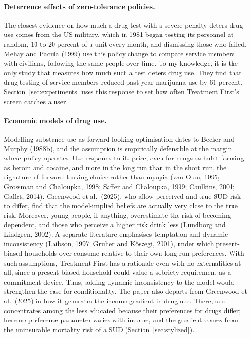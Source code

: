 \documentclass[10pt]{article}
\begin{document}
\paragraph{Deterrence effects of zero-tolerance policies.} The closest evidence on how much a drug test with a severe penalty deters drug use comes from the US military, which in 1981 began testing its personnel at random, $10$ to $20$ percent of a unit every month, and dismissing those who failed. Mehay and Pacula (1999) use this policy change to compare service members with civilians, following the same people
over time. To my knowledge, it is the only study that measures how much such a test deters drug use.    They find that drug testing of service members reduced past-year marijuana use by $61$ percent.  Section~\ref{sec:experiments} uses this response to set how often Treatment First's screen catches a user.

\paragraph{Economic models of drug use.} Modelling substance use as forward-looking
optimisation dates to Becker and Murphy (1988b), and the assumption is empirically
defensible at the margin where policy operates. Use responds to its price, even for drugs as habit-forming as heroin and cocaine, and more in the long run than in the short run, the signature of forward-looking choice rather than myopia (van Ours, 1995; Grossman and Chaloupka, 1998; Saffer and Chaloupka, 1999; Caulkins, 2001; Gallet, 2014). Greenwood et al.\ (2025), who allow perceived and true SUD risk to differ, find that the model-implied beliefs are actually very close to the true risk. Moreover, young people, if anything, overestimate the risk of becoming dependent, and those who perceive a higher risk drink less (Lundborg and Lindgren, 2002). A separate literature emphasises temptation and dynamic
inconsistency (Laibson, 1997; Gruber and K\H{o}szegi, 2001), under which
present-biased households over-consume relative to their own long-run preferences. With such assumptions, Treatment First has a rationale even with no externalities at all, since a present-biased household could value a sobriety requirement as a commitment device.   Thus, adding dynamic inconsistency to the model would strengthen the case for conditionality. The paper also departs from Greenwood et al.\ (2025) in how it generates the income gradient in drug use. There, use concentrates among the less educated because their preferences for drugs differ; here no preference parameter varies with income, and the gradient comes from the uninsurable mortality risk of a SUD (Section~\ref{sec:stylized}).
\end{document}
